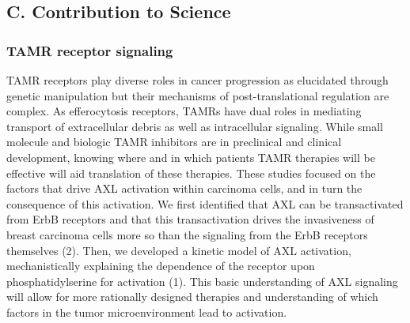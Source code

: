 \documentclass[11pt]{article}
\begin{document}
\subsection{C. Contribution to Science}


\subsubsection{TAMR receptor signaling}

TAMR receptors play diverse roles in cancer progression as elucidated through genetic manipulation but their mechanisms of post-translational regulation are complex. As efferocytosis receptors, TAMRs have dual roles in mediating transport of extracellular debris as well as intracellular signaling. While small molecule and biologic TAMR inhibitors are in preclinical and clinical development, knowing where and in which patients TAMR therapies will be effective will aid translation of these therapies. These studies focused on the factors that drive AXL activation within carcinoma cells, and in turn the consequence of this activation. We first identified that AXL can be transactivated from ErbB receptors and that this transactivation drives the invasiveness of breast carcinoma cells more so than the signaling from the ErbB receptors themselves (2). Then, we developed a kinetic model of AXL activation, mechanistically explaining the dependence of the receptor upon phosphatidylserine for activation (1). This basic understanding of AXL signaling will allow for more rationally designed therapies and understanding of which factors in the tumor microenvironment lead to activation.
\end{document}
